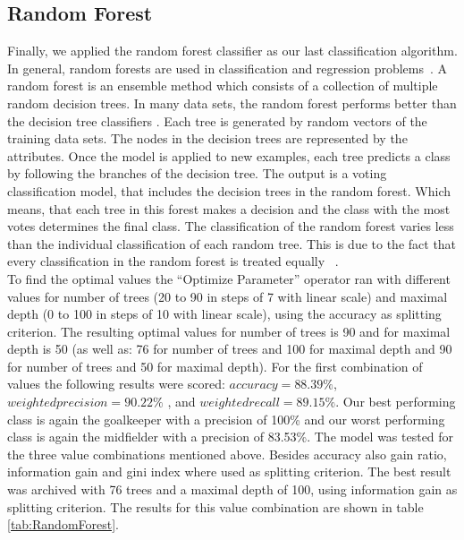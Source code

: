 \subsection{Random Forest}
Finally, we applied the random forest classifier as our last classification algorithm. In general, random forests are used in classification and regression problems~\cite{ref_rapidminerRandomForest}.
A random forest is an ensemble method which consists of a collection of multiple random decision trees. In many data sets, the random forest performs better than the decision tree classifiers \cite{ref_Tan}. 
Each tree is generated by random vectors of the training data sets. The nodes in the decision trees are represented by the attributes. \newline 
Once the model is applied to new examples, each tree predicts a class by following the branches of the decision tree. The output is a voting classification model, that includes the decision trees in the random forest. Which means, that each tree in this forest makes a decision and the class with the most votes determines the final class. The classification of the random forest varies less than the individual classification of each random tree. This is due to the fact that every classification in the random forest is treated equally ~\cite{ref_rapidminerRandomForest}. \\
To find the optimal values the ``Optimize Parameter'' operator ran with different values for number of trees (20 to 90 in steps of 7 with linear scale) and maximal depth (0 to 100 in steps of 10 with linear scale), using the accuracy as splitting criterion. The resulting optimal values for number of trees is 90 and for maximal depth is 50 (as well as: 76 for number of trees and 100 for maximal depth and 90 for number of trees and 50 for maximal depth). 
For the first combination of values the following results were scored: $accuracy = 88.39\%$, $weighted precision = 90.22\%$ , and $weighted recall = 89.15\%$. Our best performing class is again the goalkeeper with a precision of 100\% and our worst performing class is again the midfielder with a precision of 83.53\%. The model was tested for the three
value combinations mentioned above. 
Besides accuracy also gain ratio, information gain and gini index where used as splitting criterion. 
The best result was archived with 76 trees and a maximal depth of 100, using information gain as splitting criterion. 
The results for this value combination are shown in table \ref{tab:RandomForest}.
